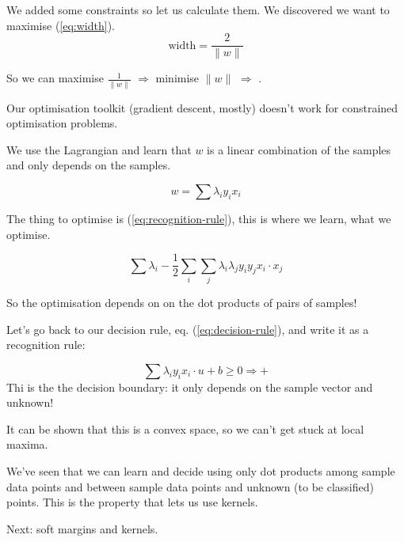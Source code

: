 We added some constraints so let us calculate them.  We discovered we
want to maximise (\ref{eq:width}).
\begin{equation}
  \label{eq:width}
  \mbox{width} = \frac{2}{\parallel w\parallel}
\end{equation}

So we can maximise $\frac{1}{\parallel w\parallel}$ $\Rightarrow$
minimise $\parallel w\parallel$ $\Rightarrow$
.

\bigskip

Our optimisation toolkit (gradient descent, mostly) doesn't work for
constrained optimisation problems.

We use the Lagrangian and learn that $w$ is a linear combination of
the samples and only depends on the samples.

\begin{equation}
  \label{eq:w}
  w = \sum\lambda_i y_i x_i
\end{equation}

The thing to optimise is (\ref{eq:recognition-rule}), this is where we
learn, what we optimise.

\begin{equation}
  \label{eq:learning-rule}
  \sum\lambda_i - \frac 12 \sum_i \sum_j \lambda_i \lambda_j y_i y_j
  x_i\cdot x_j
\end{equation}

So the optimisation depends on on the dot products of pairs of
samples!

\bigskip

Let's go back to our decision rule, eq. (\ref{eq:decision-rule}), and
write it as a recognition rule:

\begin{equation}
  \label{eq:recognition-rule}
  \sum \lambda_i y_i x_i\cdot u + b \ge 0 \Rightarrow +
\end{equation}
Thi is the the decision boundary: it only depends on the sample vector
and unknown!

It can be shown that this is a convex space, so we can't get stuck at
local maxima.

We've seen that we can learn and decide using only dot products among
sample data points and between sample data points and unknown (to be
classified) points.  This is the property that lets us use kernels.

\bigskip

Next: soft margins and kernels.

